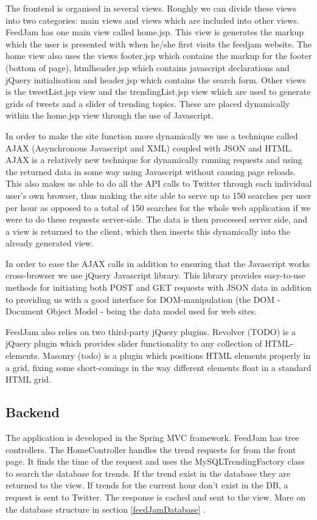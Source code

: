 The frontend is organised in several views. Roughly we can divide these views into two categories: main views and views which are included into other views. FeedJam has one main view called home.jsp. This view is generates the markup which the user is presented with when he/she first visits the feedjam website. The home view also uses the views footer.jsp which contains the markup for the footer (bottom of page), htmlheader.jsp which contains javascript declarations and jQuery initialisation and header.jsp which contains the search form. Other views is the tweetList.jsp view and the trendingList.jsp view which are used to generate grids of tweets and a slider of trending topics. These are placed dynamically within the home.jsp view through the use of Javascript.

In order to make the site function more dynamically we use a technique called AJAX (Asynchronous Javascript and XML) coupled with JSON and HTML. AJAX is a relatively new technique for dynamically running requests and using the returned data in some way using Javascript without causing page reloads. This also makes us able to do all the API calls to Twitter through each individual user's own browser, thus making the site able to serve up to 150 searches per user per hour as opposed to a total of 150 searches for the whole web application if we were to do these requests server-side. The data is then processed server side, and a view is returned to the client, which then inserts this dynamically into the already generated view.

In order to ease the AJAX calls in addition to ensuring that the Javascript works cross-browser we use jQuery Javascript library. This library provides easy-to-use methods for initiating both POST and GET requests with JSON data in addition to providing us with a good interface for DOM-manipulation (the DOM - Document Object Model - being the data model used for web sites.

FeedJam also relies on two third-party jQuery plugins. Revolver (TODO) is a jQuery plugin which provides slider functionality to any collection of HTML-elements. Masonry (todo) is a plugin which positions HTML elements properly in a grid, fixing some short-comings in the way different elements float in a standard HTML grid.


\subsection{Backend} %
The application is developed in the Spring MVC framework. FeedJam has tree controllers. The HomeController handles the trend requests for from the front page. It finds the time of the request and uses the MySQLTrendingFactory class to search the database for trends. If the trend exist in the database they are returned to the view. If trends for the current hour don't exist in the DB, a request is sent to Twitter. The response is cached and sent to the view. More on the database structure in section \ref{feedJamDatabase} .

